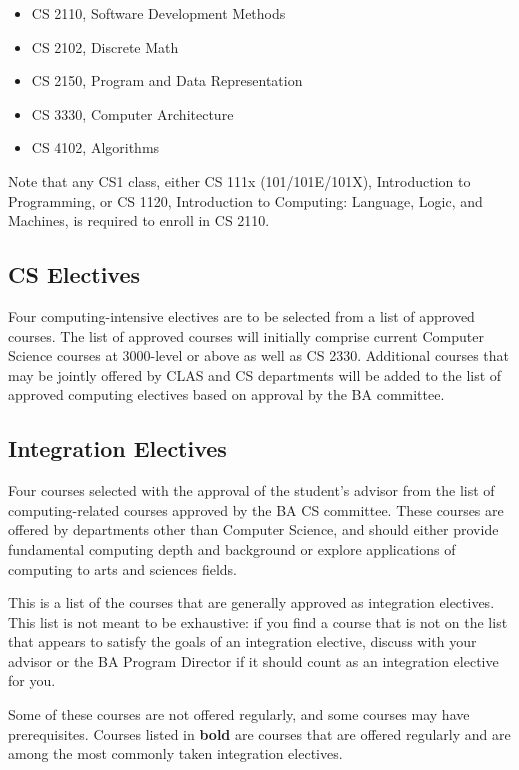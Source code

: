 \documentclass[10pt,letter]{book}
\newenvironment{itemlist}{
\begin{itemize}
\setlength{\itemsep}{0pt}
\setlength{\parskip}{0pt}}
{\end{itemize}}
\begin{document}
\begin{itemlist}
\item CS 2110, Software Development Methods
\item CS 2102, Discrete Math
\item CS 2150, Program and Data Representation
\item CS 3330, Computer Architecture
\item CS 4102, Algorithms
\end{itemlist}

Note that any CS1 class, either CS 111x (101/101E/101X), Introduction
to Programming, or CS 1120, Introduction to Computing: Language,
Logic, and Machines, is required to enroll in CS 2110.

\subsection{CS Electives}

Four computing-intensive electives are to be selected from a list of
approved courses. The list of approved courses will initially comprise
current Computer Science courses at 3000-level or above as well as CS
2330. Additional courses that may be jointly offered by CLAS and CS
departments will be added to the list of approved computing electives
based on approval by the BA committee.


\subsection{Integration Electives}

Four courses selected with the approval of the student's advisor from
the list of computing-related courses approved by the BA CS
committee. These courses are offered by departments other than
Computer Science, and should either provide fundamental computing
depth and background or explore applications of computing to arts and
sciences fields. 

This is a list of the courses that are generally approved as
integration electives. This list is not meant to be exhaustive: if you
find a course that is not on the list that appears to satisfy the
goals of an integration elective, discuss with your advisor or the BA
Program Director if it should count as an integration elective for
you.

Some of these courses are not offered regularly, and some courses may
have prerequisites. Courses listed in {\bf bold} are courses that are
offered regularly and are among the most commonly taken integration
electives.
\end{document}
